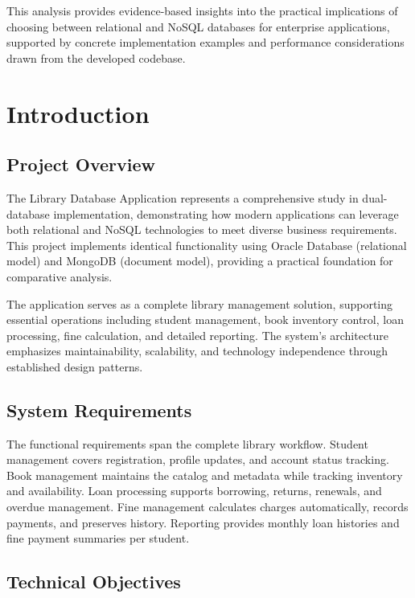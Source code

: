 \documentclass[12pt,a4paper]{article}
\begin{document}
This analysis provides evidence-based insights into the practical implications of choosing between relational and NoSQL databases for enterprise applications, supported by concrete implementation examples and performance considerations drawn from the developed codebase.

\section{Introduction}

\subsection{Project Overview}

The Library Database Application represents a comprehensive study in dual-database implementation, demonstrating how modern applications can leverage both relational and NoSQL technologies to meet diverse business requirements. This project implements identical functionality using Oracle Database (relational model) and MongoDB (document model), providing a practical foundation for comparative analysis.

The application serves as a complete library management solution, supporting essential operations including student management, book inventory control, loan processing, fine calculation, and detailed reporting. The system's architecture emphasizes maintainability, scalability, and technology independence through established design patterns.

\subsection{System Requirements}

The functional requirements span the complete library workflow. Student management covers registration, profile updates, and account status tracking. Book management maintains the catalog and metadata while tracking inventory and availability. Loan processing supports borrowing, returns, renewals, and overdue management. Fine management calculates charges automatically, records payments, and preserves history. Reporting provides monthly loan histories and fine payment summaries per student.

\subsection{Technical Objectives}
\end{document}
